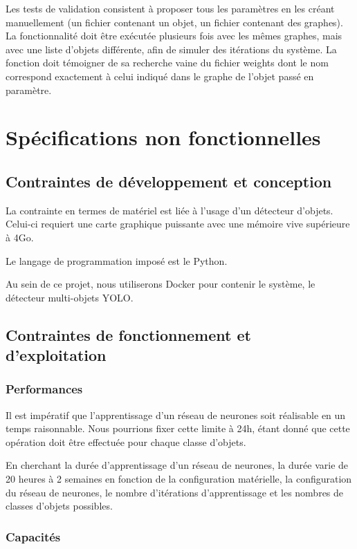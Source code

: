 \documentclass[debug,nodate,hideweeklyreports,noposter]{polytech/polytech}
\begin{document}
Les tests de validation consistent à proposer tous les paramètres en les créant manuellement (un fichier contenant un objet, un fichier contenant des graphes). La fonctionnalité doit être exécutée plusieurs fois avec les mêmes graphes, mais avec une liste d'objets différente, afin de simuler des itérations du système. La fonction doit témoigner de sa recherche vaine du fichier weights dont le nom correspond exactement à celui indiqué dans le graphe de l'objet passé en paramètre.

\chapter{Spécifications non fonctionnelles}
\label{ann:chap3}

\section{Contraintes de développement et conception}

La contrainte en termes de matériel est liée à l’usage d’un détecteur d’objets. Celui-ci requiert une carte graphique puissante avec une mémoire vive supérieure à 4Go.

Le langage de programmation imposé est le Python.

Au sein de ce projet, nous utiliserons Docker pour contenir le système, le détecteur multi-objets YOLO. 

\section{Contraintes de fonctionnement et d’exploitation}

\subsection{Performances}

Il est impératif que l’apprentissage d’un réseau de neurones soit réalisable en un temps raisonnable. Nous pourrions fixer cette limite à 24h, étant donné que cette opération doit être effectuée pour chaque classe d’objets.

En cherchant la durée d’apprentissage d’un réseau de neurones, la durée varie de 20 heures à 2 semaines en fonction de la configuration matérielle, la configuration du réseau de neurones, le nombre d’itérations d’apprentissage et les nombres de classes d’objets possibles.

\subsection{Capacités}
\end{document}
